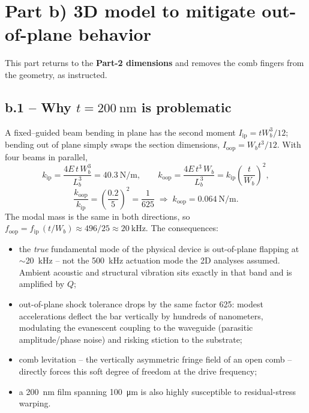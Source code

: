 \section{Part b) 3D model to mitigate out-of-plane behavior}

This part returns to the \textbf{Part-2 dimensions} and removes the comb
fingers from the geometry, as instructed.

\subsection*{b.1 -- Why $t=\SI{200}{\nano\meter}$ is problematic}

A fixed--guided beam bending in plane has the second moment
$I_{\mathrm{ip}}=tW_{b}^{3}/12$; bending out of plane simply swaps the
section dimensions, $I_{\mathrm{oop}}=W_{b}t^{3}/12$. With four beams in
parallel,
\begin{equation}
  k_{\mathrm{ip}}=\frac{4E\,t\,W_{b}^{3}}{L_{b}^{3}}=\SI{40.3}{\newton\per\meter},
  \qquad
  k_{\mathrm{oop}}=\frac{4E\,t^{3}\,W_{b}}{L_{b}^{3}}
  =k_{\mathrm{ip}}\left(\frac{t}{W_{b}}\right)^{2},
\end{equation}
\begin{equation}
  \frac{k_{\mathrm{oop}}}{k_{\mathrm{ip}}}
  =\left(\frac{0.2}{5}\right)^{2}=\frac{1}{625}
  \;\Rightarrow\;
  k_{\mathrm{oop}}=\SI{0.064}{\newton\per\meter}.
\end{equation}
The modal mass is the same in both directions, so
$f_{\mathrm{oop}}=f_{\mathrm{ip}}\,(t/W_{b})\approx496/25\approx
\SI{20}{\kilo\hertz}$. The consequences:
\begin{itemize}
  \item the \emph{true} fundamental mode of the physical device is
        out-of-plane flapping at $\sim$\SI{20}{\kilo\hertz} -- not the
        \SI{500}{\kilo\hertz} actuation mode the 2D analyses assumed. Ambient
        acoustic and structural vibration sits exactly in that band and is
        amplified by $Q$;
  \item out-of-plane shock tolerance drops by the same factor 625:
        modest accelerations deflect the bar vertically by hundreds of
        nanometers, modulating the evanescent coupling to the waveguide
        (parasitic amplitude/phase noise) and risking stiction to the
        substrate;
  \item comb levitation -- the vertically asymmetric fringe field of an open
        comb -- directly forces this soft degree of freedom at the drive
        frequency;
  \item a \SI{200}{\nano\meter} film spanning \SI{100}{\micro\meter} is also
        highly susceptible to residual-stress warping.
\end{itemize}

